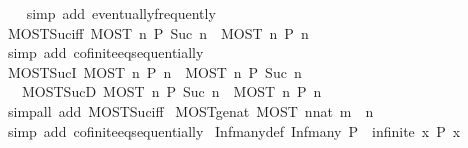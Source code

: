 \begin{isabellebody}
%
\isadelimproof
\ \ %
\endisadelimproof
%
\isatagproof
{}\isamarkupfalse%
\ {\isacharparenleft}simp\ add{\isacharcolon}\ eventually{\isacharunderscore}frequently{\isacharparenright}%
\endisatagproof
{\isafoldproof}%
%
\isadelimproof
\isanewline
%
\endisadelimproof
\isanewline
{}\isamarkupfalse%
\ MOST{\isacharunderscore}Suc{\isacharunderscore}iff{\isacharcolon}\ {\isachardoublequoteopen}{\isacharparenleft}MOST\ n{\isachardot}\ P\ {\isacharparenleft}Suc\ n{\isacharparenright}{\isacharparenright}\ {\isasymlongleftrightarrow}\ {\isacharparenleft}MOST\ n{\isachardot}\ P\ n{\isacharparenright}{\isachardoublequoteclose}\isanewline
%
\isadelimproof
\ \ %
\endisadelimproof
%
\isatagproof
{}\isamarkupfalse%
\ {\isacharparenleft}simp\ add{\isacharcolon}\ cofinite{\isacharunderscore}eq{\isacharunderscore}sequentially{\isacharparenright}%
\endisatagproof
{\isafoldproof}%
%
\isadelimproof
\isanewline
%
\endisadelimproof
\isanewline
{}\isamarkupfalse%
\ MOST{\isacharunderscore}SucI{\isacharcolon}\ {\isachardoublequoteopen}MOST\ n{\isachardot}\ P\ n\ {\isasymLongrightarrow}\ MOST\ n{\isachardot}\ P\ {\isacharparenleft}Suc\ n{\isacharparenright}{\isachardoublequoteclose}\isanewline
\ \ \ MOST{\isacharunderscore}SucD{\isacharcolon}\ {\isachardoublequoteopen}MOST\ n{\isachardot}\ P\ {\isacharparenleft}Suc\ n{\isacharparenright}\ {\isasymLongrightarrow}\ MOST\ n{\isachardot}\ P\ n{\isachardoublequoteclose}\isanewline
%
\isadelimproof
\ \ %
\endisadelimproof
%
\isatagproof
{}\isamarkupfalse%
\ {\isacharparenleft}simp{\isacharunderscore}all\ add{\isacharcolon}\ MOST{\isacharunderscore}Suc{\isacharunderscore}iff{\isacharparenright}%
\endisatagproof
{\isafoldproof}%
%
\isadelimproof
\isanewline
%
\endisadelimproof
\isanewline
{}\isamarkupfalse%
\ MOST{\isacharunderscore}ge{\isacharunderscore}nat{\isacharcolon}\ {\isachardoublequoteopen}MOST\ n{\isacharcolon}{\isacharcolon}nat{\isachardot}\ m\ {\isasymle}\ n{\isachardoublequoteclose}\isanewline
%
\isadelimproof
\ \ %
\endisadelimproof
%
\isatagproof
{}\isamarkupfalse%
\ {\isacharparenleft}simp\ add{\isacharcolon}\ cofinite{\isacharunderscore}eq{\isacharunderscore}sequentially{\isacharparenright}\isanewline
\isanewline
%
%
\endisatagproof
{\isafoldproof}%
%
\isadelimproof
\isanewline
%
\endisadelimproof
{}\isamarkupfalse%
\ Inf{\isacharunderscore}many{\isacharunderscore}def{\isacharcolon}\ {\isachardoublequoteopen}Inf{\isacharunderscore}many\ P\ {\isasymlongleftrightarrow}\ infinite\ {\isacharbraceleft}x{\isachardot}\ P\ x{\isacharbraceright}{\isachardoublequoteclose}%

\end{isabellebody}
